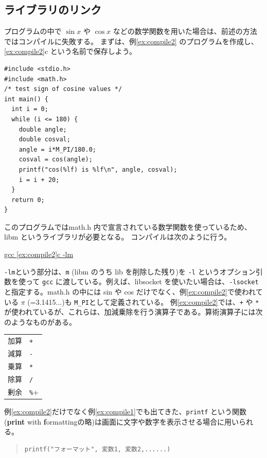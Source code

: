 \subsection{ライブラリのリンク}
プログラムの中で $\sin x$ や $\cos x$ などの数学関数を用いた場合は、前述の方法ではコンパイルに失敗する。
まずは、例\ref{ex:compile2} のプログラムを作成し、\ref{ex:compile2}c という名前で保存しよう。
\begin{reidai}\label{ex:compile2}
\begin{verbatim}
#include <stdio.h>
#include <math.h>
/* test sign of cosine values */
int main() {
  int i = 0;
  while (i <= 180) {
    double angle;
    double cosval;
    angle = i*M_PI/180.0;
    cosval = cos(angle);
    printf("cos(%lf) is %lf\n", angle, cosval);
    i = i + 20;
  }
  return 0;
}
\end{verbatim}
\end{reidai} \noindent
このプログラムではmath.h 内で宣言されている数学関数を使っているため、libm というライブラリが必要となる。
コンパイルは次のように行う。
\begin{commandline2}
\prompt \underline{gcc \ref{ex:compile2}c -lm}
\end{commandline2} \noindent
\verb+-lm+という部分は、\verb+m+ (libm のうち lib を削除した残り)を \verb+-l+ というオプション引数を使って \verb+gcc+ に渡している。例えば、libsocket を使いたい場合は、\verb+-lsocket+ と指定する。math.h の中には sin や cos だけでなく、例\ref{ex:compile2}で使われている $\pi$ (=3.1415...)も \verb+M_PI+として定義されている。
例\ref{ex:compile2}では、\verb|+| や \verb+*+ が使われているが、これらは、加減乗除を行う演算子である。算術演算子には次のようなものがある。
\begin{table}[H]
\begin{center}
\begin{tabular}{ll}
  加算 & \verb|+| \\
  減算 & \verb+-+ \\
  乗算 & \verb+*+ \\
  除算 & \verb+/+ \\
  剰余 & \verb+%+
\end{tabular}
\end{center}
\end{table} \noindent
例\ref{ex:compile2}だけでなく例\ref{ex:compile1}でも出てきた、\verb+printf+ という関数(\textbf{print} with \textbf{f}ormattingの略)は画面に文字や数字を表示させる場合に用いられる。
\begin{quote}
\begin{verbatim}
printf("フォーマット", 変数1, 変数2,......)
\end{verbatim}
\end{quote}
